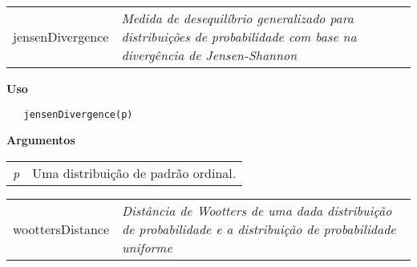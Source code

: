 \hrulefill   

\begin{table}[!ht]
\begin{center}
\begin{tabularx}{\textwidth}{ X X}
\hspace{0.5cm} jensenDivergence & \textit{Medida de desequilíbrio generalizado para distribuições de probabilidade com base na divergência de Jensen-Shannon}\\
\end{tabularx}
\end{center}
\end{table} 

\vspace{-0.5cm}

\hrulefill  

\vspace{0.5cm}

\textbf{Uso}

\begin{lstlisting}
   jensenDivergence(p)
\end{lstlisting}

\vspace{0.5cm}

\textbf{Argumentos}

\begin{table}[!ht]
\begin{center}
\begin{tabularx}{\textwidth}{X X}
\hspace{0.5cm} \textit{p} & Uma distribuição de padrão ordinal.\\
\end{tabularx}
\end{center}
\end{table} 

\newpage

\hrulefill   

\begin{table}[!ht]
\begin{center}
\begin{tabularx}{\textwidth}{ X X}
\hspace{0.5cm} woottersDistance & \textit{Distância de Wootters de uma dada distribuição de probabilidade e a distribuição de probabilidade uniforme}\\
\end{tabularx}
\end{center}
\end{table} 

